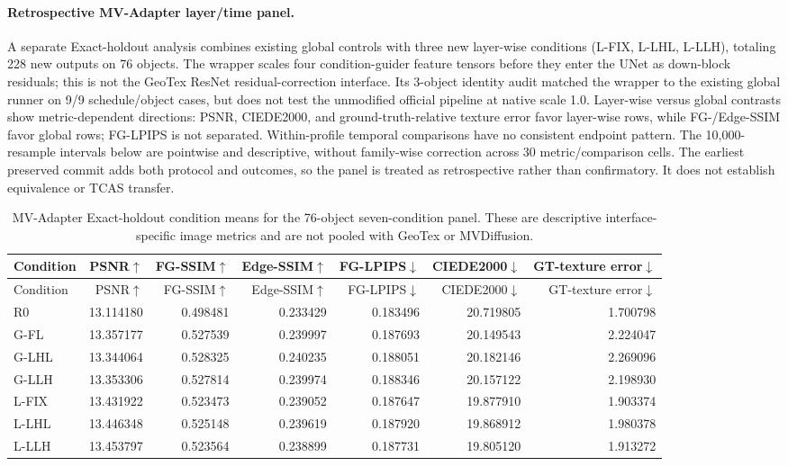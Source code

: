 \documentclass[11pt]{article}
\begin{document}
\paragraph{Retrospective MV-Adapter layer/time panel.} A separate Exact-holdout analysis combines existing global controls with three new layer-wise conditions (L-FIX, L-LHL, L-LLH), totaling 228 new outputs on 76 objects. The wrapper scales four condition-guider feature tensors before they enter the UNet as down-block residuals; this is not the GeoTex ResNet residual-correction interface. Its 3-object identity audit matched the wrapper to the existing global runner on 9/9 schedule/object cases, but does not test the unmodified official pipeline at native scale 1.0. Layer-wise versus global contrasts show metric-dependent directions: PSNR, CIEDE2000, and ground-truth-relative texture error favor layer-wise rows, while FG-/Edge-SSIM favor global rows; FG-LPIPS is not separated. Within-profile temporal comparisons have no consistent endpoint pattern. The 10,000-resample intervals below are pointwise and descriptive, without family-wise correction across 30 metric/comparison cells. The earliest preserved commit adds both protocol and outcomes, so the panel is treated as retrospective rather than confirmatory. It does not establish equivalence or TCAS transfer.
\begingroup\scriptsize
\begin{longtable}{lrrrrrr}
\caption{MV-Adapter Exact-holdout condition means for the 76-object seven-condition panel. These are descriptive interface-specific image metrics and are not pooled with GeoTex or MVDiffusion.}\label{tab:mvadapter-layerwise-means}\\
\toprule Condition & PSNR$\uparrow$ & FG-SSIM$\uparrow$ & Edge-SSIM$\uparrow$ & FG-LPIPS$\downarrow$ & CIEDE2000$\downarrow$ & GT-texture error$\downarrow$ \\
\midrule\endfirsthead
\toprule Condition & PSNR$\uparrow$ & FG-SSIM$\uparrow$ & Edge-SSIM$\uparrow$ & FG-LPIPS$\downarrow$ & CIEDE2000$\downarrow$ & GT-texture error$\downarrow$ \\
\midrule\endhead
R0 & 13.114180 & 0.498481 & 0.233429 & 0.183496 & 20.719805 & 1.700798 \\
G-FL & 13.357177 & 0.527539 & 0.239997 & 0.187693 & 20.149543 & 2.224047 \\
G-LHL & 13.344064 & 0.528325 & 0.240235 & 0.188051 & 20.182146 & 2.269096 \\
G-LLH & 13.353306 & 0.527814 & 0.239974 & 0.188346 & 20.157122 & 2.198930 \\
L-FIX & 13.431922 & 0.523473 & 0.239052 & 0.187647 & 19.877910 & 1.903374 \\
L-LHL & 13.446348 & 0.525148 & 0.239619 & 0.187920 & 19.868912 & 1.980378 \\
L-LLH & 13.453797 & 0.523564 & 0.238899 & 0.187731 & 19.805120 & 1.913272 \\
\bottomrule
\end{longtable}
\end{document}
